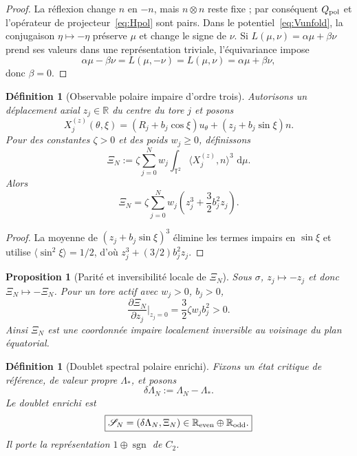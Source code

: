 \documentclass[11pt,a4paper]{article}
\newtheorem{proposition}[theorem]{Proposition}
\newtheorem{definition}[theorem]{Définition}
\newcommand{\R}{\mathbb R}
\newcommand{\T}{\mathbb T}
\newcommand{\dd}{\,\mathrm d}
\begin{document}
\begin{proof}
La réflexion change $n$ en $-n$, mais $n\otimes n$ reste fixe ; par conséquent $Q_{\rm pol}$ et l'opérateur de projecteur~\eqref{eq:Hpol} sont pairs. Dans le potentiel~\eqref{eq:Vunfold}, la conjugaison $\eta\mapsto-\eta$ préserve $\mu$ et change le signe de $\nu$. Si $L(\mu,\nu)=\alpha\mu+\beta\nu$ prend ses valeurs dans une représentation triviale, l'équivariance impose
\[
 \alpha\mu-\beta\nu=L(\mu,-\nu)=L(\mu,\nu)=\alpha\mu+\beta\nu,
\]
donc $\beta=0$.
\end{proof}

\begin{definition}[Observable polaire impaire d'ordre trois]\label{def:XiN}
Autorisons un déplacement axial $z_j\in\R$ du centre du tore $j$ et posons
\[
 X_j^{(z)}(\theta,\xi)=
 (R_j+b_j\cos\xi)u_\theta+(z_j+b_j\sin\xi)n.
\]
Pour des constantes $\zeta>0$ et des poids $w_j\ge0$, définissons
\begin{equation}\label{eq:XiN}
 \Xi_N:=\zeta\sum_{j=0}^{N}w_j
 \int_{\T^2}\langle X_j^{(z)},n\rangle^3\,\dd\mu.
\end{equation}
Alors
\begin{equation}\label{eq:XiN-exact}
 \boxed{\Xi_N=\zeta\sum_{j=0}^{N}w_j
 \left(z_j^3+\frac32b_j^2z_j\right).}
\end{equation}
\end{definition}

\begin{proof}
La moyenne de $(z_j+b_j\sin\xi)^3$ élimine les termes impairs en $\sin\xi$ et utilise $\langle\sin^2\xi\rangle=1/2$, d'où $z_j^3+(3/2)b_j^2z_j$.
\end{proof}

\begin{proposition}[Parité et inversibilité locale de $\Xi_N$]\label{prop:Xi-parity}
Sous $\sigma$, $z_j\mapsto-z_j$ et donc $\Xi_N\mapsto-\Xi_N$. Pour un tore actif avec $w_j>0$, $b_j>0$,
\[
 \frac{\partial\Xi_N}{\partial z_j}\Big|_{z_j=0}
 =\frac32\zeta w_jb_j^2>0.
\]
Ainsi $\Xi_N$ est une coordonnée impaire localement inversible au voisinage du plan équatorial.
\end{proposition}

\begin{definition}[Doublet spectral polaire enrichi]\label{def:enriched-spectrum}
Fixons un état critique de référence, de valeur propre $\Lambda_*$, et posons
\[
 \delta\Lambda_N:=\Lambda_N-\Lambda_*.
\]
Le doublet enrichi est
\begin{equation}\label{eq:SN-doublet}
 \boxed{\mathscr S_N=(\delta\Lambda_N,\Xi_N)\in\R_{\rm even}\oplus\R_{\rm odd}.}
\end{equation}
Il porte la représentation $1\oplus\operatorname{sgn}$ de $C_2$.
\end{definition}
\end{document}
